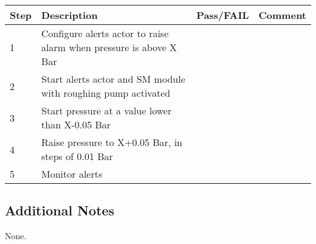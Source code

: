 \begin{table}[H]
    \begin{tabular}{|l| p{5cm} |l| p{5cm} |}
    \hline
    {\bf Step} & {\bf Description} & {\bf Pass/FAIL} & {\bf Comment}  \\ \hline
    1 & Configure alerts actor to raise alarm when pressure is above X Bar &  &  \\ \hline
    2 & Start alerts actor and SM module with roughing pump activated &  & \\ \hline
    3 & Start pressure at a value lower than X-0.05 Bar &  & \\ \hline
    4 & Raise pressure to X+0.05 Bar, in steps of 0.01 Bar &  & \\ \hline
    5 & Monitor alerts &  & \\ \hline
    \end{tabular}
\end{table}

\subsection{Additional Notes}

None.
